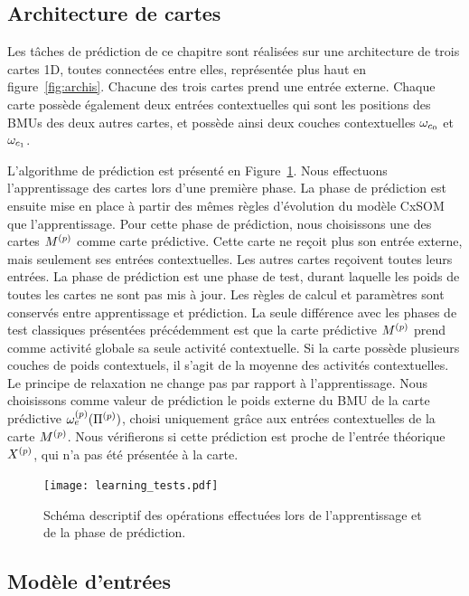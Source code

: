 \documentclass[../main]{subfiles}
\begin{document}
\subsection{Architecture de cartes}

Les tâches de prédiction de ce chapitre sont réalisées sur une architecture de trois cartes 1D, toutes connectées entre elles, représentée plus haut en figure~\ref{fig:archis}. Chacune des trois cartes prend une entrée externe.
Chaque carte possède également deux entrées contextuelles qui sont les positions des BMUs des deux autres cartes, et possède ainsi deux couches contextuelles $\omega_{c_0}$ et $\omega_{c_1}$.

L'algorithme de prédiction est présenté en Figure~\ref{fig:schema_pred}. 
Nous effectuons l'apprentissage des cartes lors d'une première phase.
La phase de prédiction est ensuite mise en place à partir des mêmes règles d'évolution du modèle CxSOM que l'apprentissage.
Pour cette phase de prédiction, nous choisissons une des cartes $M^{({p})}$ comme carte prédictive. Cette carte ne reçoit plus son entrée externe, mais seulement ses entrées contextuelles.  Les autres cartes reçoivent toutes leurs entrées.
La phase de prédiction est une phase de test, durant laquelle les poids de toutes les cartes ne sont pas mis à jour. Les règles de calcul et paramètres sont conservés entre apprentissage et prédiction.
La seule différence avec les phases de test classiques présentées précédemment est que la carte prédictive $M^{({p})}$ prend comme activité globale sa seule activité contextuelle.
Si la carte possède plusieurs couches de poids contextuels, il s'agit de la moyenne des activités contextuelles.
Le principe de relaxation ne change pas par rapport à l'apprentissage.
Nous choisissons comme valeur de prédiction le poids externe du BMU de la carte prédictive $\omega_{e}^{({p})}(\Pi^{({p})})$, choisi uniquement grâce aux entrées contextuelles de la carte $M^{({p})}$. 
Nous vérifierons si cette prédiction est proche de l'entrée théorique $X^{({p})}$, qui n'a pas été présentée à la carte.

\begin{figure}
	\texttt{[image: learning\_tests.pdf]}
	\caption{Schéma descriptif des opérations effectuées lors de l'apprentissage et de la phase de prédiction.\label{fig:schema_pred}}
\end{figure}

\subsection{Modèle d'entrées}
\end{document}
